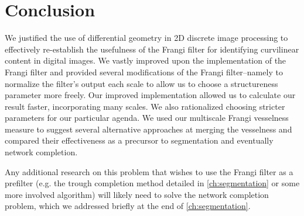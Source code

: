 \chapter{Conclusion} \label{ch:conclusion}

We justified the use of differential geometry in 2D discrete image processing to effectively re-establish the usefulness of the Frangi filter for identifying curvilinear content in digital images. We vastly improved upon the implementation of the Frangi filter and provided several modifications of the Frangi filter--namely to normalize the filter's output each scale to allow us to choose a structureness parameter more freely.
Our improved implementation allowed us to calculate our result faster, incorporating many scales. We also rationalized choosing stricter parameters for our particular agenda. We used our multiscale Frangi vesselness measure to suggest several alternative approaches at merging the vesselness and compared their effectiveness as a precursor to segmentation and eventually network completion. 

Any additional research on this problem that wishes to use the Frangi filter as a prefilter  (e.g. the trough completion method detailed in \cref{ch:segmentation} or some more involved algorithm) will likely need to solve the network completion problem, which we addressed briefly at the end of \cref{ch:segmentation}.